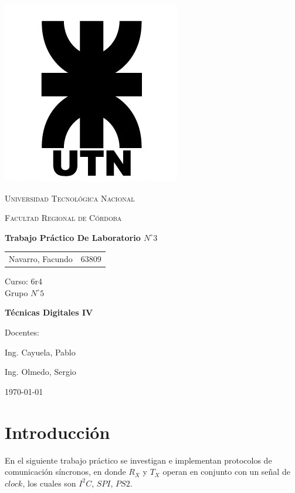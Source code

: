 \documentclass[11pt, a4paper]{article}
\begin{document}
\begin{titlepage}
 \centering
	\includegraphics[scale=0.80]{Imagenes/LOGO.jpg} \par
 	\vspace{1cm}
 	{\scshape\LARGE Universidad Tecnológica Nacional \par}
 	{\scshape\large Facultad Regional de Córdoba \par}
 	\vspace{1cm}
	{\bfseries \Large Trabajo Práctico De Laboratorio $N^{\circ} 3$\par}
 	\vspace{1.5cm}

	\begin{tabular}{ll}
		Navarro, Facundo		&	63809 	
	\end{tabular}
	
	\vspace{1cm}
	Curso: 6r4 \\
	Grupo $N^{\circ} 5$
 	\vfill
	{\bfseries \Large Técnicas Digitales IV\par}

	\vspace{1.5cm}
	Docentes: \par
	Ing. Cayuela, Pablo \par
	Ing. Olmedo, Sergio \par

 	\vfill
	{\large \today\par}
\end{titlepage}
	
	
\tableofcontents
\clearpage

\section{Introducción}
En el siguiente trabajo práctico se investigan e implementan protocolos de comunicación síncronos, en donde $R_X$ y $T_X$ operan en conjunto con un señal de $clock$, los cuales son $I^{2}C$, $SPI$, $PS2$.
\end{document}
